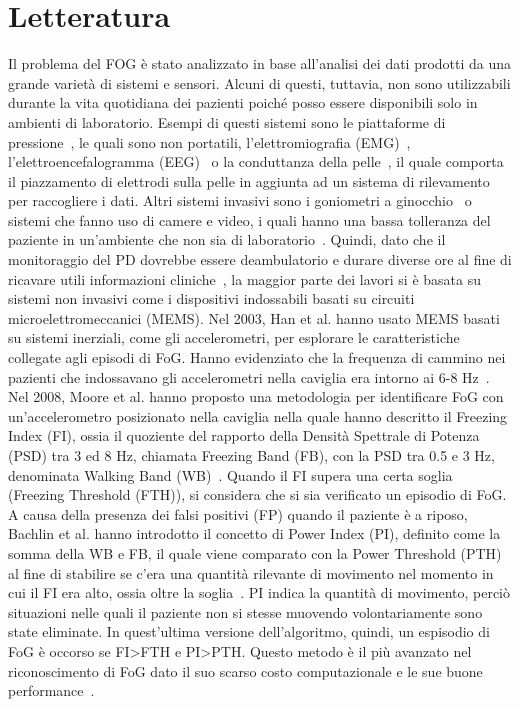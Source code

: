 



\chapter{Letteratura}\label{chap2:related}
Il problema del FOG è stato analizzato in base all'analisi dei dati prodotti da una grande varietà di sistemi e sensori. Alcuni di questi, tuttavia, non sono utilizzabili durante la vita quotidiana dei pazienti poiché posso essere disponibili solo in ambienti di laboratorio. Esempi di questi sistemi sono le piattaforme di pressione~\cite{38}, le quali sono non portatili, l'elettromiografia (EMG)~\cite{25}, l'elettroencefalogramma (EEG)~\cite{42} o la conduttanza della pelle~\cite{43}, il quale comporta il piazzamento di elettrodi sulla pelle in aggiunta ad un sistema di rilevamento per raccogliere i dati.
Altri sistemi invasivi sono i goniometri a ginocchio~\cite{23} o sistemi che fanno uso di camere e video, i quali hanno una bassa tolleranza del paziente in un'ambiente che non sia di laboratorio~\cite{23,39,44}. Quindi, dato che il monitoraggio del PD dovrebbe essere deambulatorio e  durare diverse ore al fine di ricavare utili informazioni cliniche~\cite{34,45}, la maggior parte dei lavori si è basata su sistemi non invasivi come i dispositivi indossabili basati su circuiti microelettromeccanici (MEMS). \newline
Nel 2003, Han et al. hanno usato MEMS basati su sistemi inerziali, come gli accelerometri, per esplorare le caratteristiche collegate agli episodi di FoG. Hanno evidenziato che la frequenza di cammino nei pazienti che indossavano gli accelerometri nella caviglia era intorno ai 6-8 Hz~\cite{19}. Nel 2008, Moore et al. hanno proposto una metodologia per identificare FoG con un'accelerometro posizionato nella caviglia nella quale hanno descritto il Freezing Index (FI), ossia il quoziente del rapporto della Densità Spettrale di Potenza (PSD) tra 3 ed 8 Hz, chiamata Freezing Band (FB), con la PSD tra 0.5 e 3 Hz, denominata Walking Band (WB)~\cite{21}. Quando il FI supera una certa soglia (Freezing Threshold (FTH)), si considera che si sia verificato un episodio di FoG. A causa della presenza dei falsi positivi (FP) quando il paziente è a riposo, Bachlin et al. hanno introdotto il concetto di Power Index (PI), definito come la somma della WB e FB, il quale viene comparato con la Power Threshold (PTH) al fine di stabilire se c'era una quantità rilevante di movimento nel momento in cui il FI era alto, ossia oltre la soglia~\cite{21}. PI indica la quantità di movimento, perciò situazioni nelle quali il paziente non si stesse muovendo volontariamente sono state eliminate. In quest'ultima versione dell'algoritmo, quindi, un espisodio di FoG è occorso se FI>FTH e PI>PTH. Questo metodo è il più avanzato nel riconoscimento di FoG dato il suo scarso costo computazionale e le sue buone performance~\cite{22}. \newline
